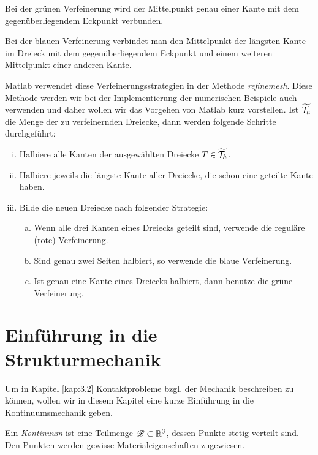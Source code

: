 Bei der grünen Verfeinerung wird der Mittelpunkt genau einer Kante mit dem gegenüberliegendem Eckpunkt verbunden.

Bei der blauen Verfeinerung verbindet man den Mittelpunkt der längsten Kante im Dreieck mit dem gegenüberliegendem Eckpunkt und einem weiteren Mittelpunkt einer anderen Kante.

Matlab verwendet diese Verfeinerungsstrategien in der Methode \textit{refinemesh}. Diese Methode werden wir bei der Implementierung der numerischen Beispiele auch verwenden und daher wollen wir das Vorgehen von Matlab kurz vorstellen. Ist $\widetilde{\mathcal T_h}$ die Menge der zu verfeinernden Dreiecke, dann werden folgende Schritte durchgeführt:
\begin{enumerate}[(i)]
\item Halbiere alle Kanten der ausgewählten Dreiecke $T \in \widetilde{\mathcal T_h}$.
\item Halbiere jeweils die längste Kante aller Dreiecke, die schon eine geteilte Kante haben. 
\item Bilde die neuen Dreiecke nach folgender Strategie:
\begin{enumerate}[(a)]
\item Wenn alle drei Kanten eines Dreiecks geteilt sind, verwende die reguläre (rote) Verfeinerung.
\item Sind genau zwei Seiten halbiert, so verwende die blaue Verfeinerung.
\item Ist genau eine Kante eines Dreiecks halbiert, dann benutze die grüne Verfeinerung.
\end{enumerate}
\end{enumerate}





\section{Einführung in die Strukturmechanik}
\label{kap:2.5}


Um in Kapitel \ref{kap:3.2} Kontaktprobleme bzgl. der Mechanik beschreiben zu können, wollen wir in diesem Kapitel eine kurze Einführung in die Kontinuumsmechanik geben.

\begin{defi}
Ein \textit{Kontinuum} ist eine Teilmenge $\mathscr{B}\subset \mathbb{R}^3$, dessen  Punkte stetig verteilt sind. Den Punkten werden gewisse Materialeigenschaften zugewiesen.
\end{defi}

